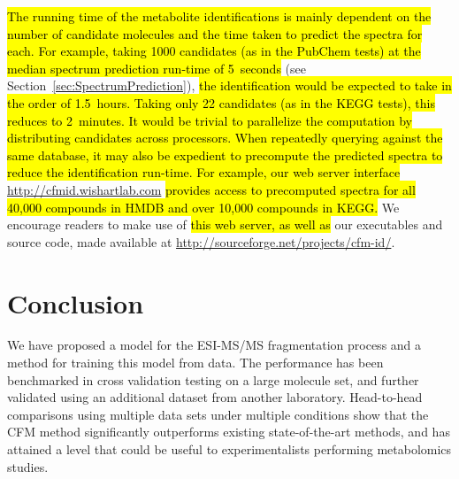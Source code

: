 \hl{The running time of the metabolite identifications is mainly dependent on the number of candidate molecules and the time taken to predict the spectra for each. For example, taking 1000 candidates (as in the PubChem tests) at the median spectrum prediction run-time of 5~seconds} (see Section~\ref{sec:SpectrumPrediction}), \hl{the identification would be expected to take in the order of 1.5~hours. Taking only 22 candidates (as in the KEGG tests), this reduces to 2~minutes. It would be trivial to parallelize the computation by distributing candidates across processors. When repeatedly querying against the same database, it may also be expedient to precompute the predicted spectra to reduce the identification run-time. For example, our web server interface} \url{http://cfmid.wishartlab.com} \hl{provides access to precomputed spectra for all 40,000 compounds in HMDB and over 10,000 compounds in KEGG.} We encourage readers to make use of \hl{this web server, as well as} our executables and source code, made available at \url{http://sourceforge.net/projects/cfm-id/}.



\section{Conclusion}

We have proposed a model for the ESI-MS/MS fragmentation process and a method for training this model from data.
The performance has been benchmarked in cross validation testing on a large molecule set, and further validated using an additional dataset from another laboratory. 
Head-to-head comparisons using multiple data sets under multiple conditions show that the CFM method significantly outperforms existing state-of-the-art methods, and has attained a level that could be useful to experimentalists performing metabolomics studies.






















